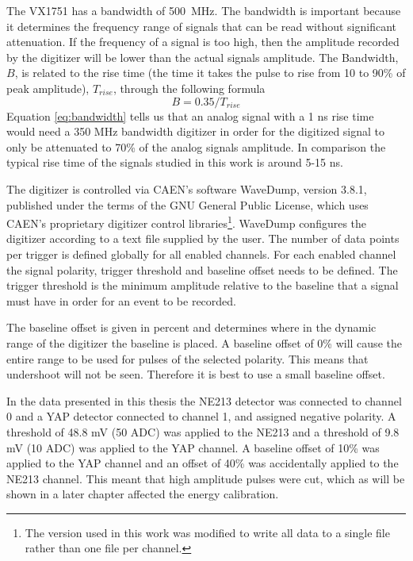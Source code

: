 \documentclass[main.tex]{subfiles}
\begin{document}
The VX1751 has a bandwidth of \si{500 \mega\hertz}. The bandwidth is important because it determines the frequency range of signals that can be read without significant attenuation. If the frequency of a signal is too high, then the amplitude recorded by the digitizer will be lower than the actual signals amplitude. The Bandwidth, $B$, is related to the rise time (the time it takes the pulse to rise from 10 to 90\% of peak amplitude), $T_{rise}$, through the following formula\cite[p.354]{Leo}
\begin{equation}
\label{eq:bandwidth}
B=0.35/T_{rise}
\end{equation}
Equation \ref{eq:bandwidth} tells us that an analog signal with a 1 ns rise time would need a 350 MHz bandwidth digitizer in order for the digitized signal to only be attenuated to 70\% of the analog signals amplitude. In comparison the typical rise time of the signals studied in this work is around 5-15 ns.

The digitizer is controlled via CAEN's software WaveDump, version 3.8.1, published under the terms of the GNU General Public License\cite{WaveDump}, which uses CAEN's proprietary digitizer control libraries\footnote{The version used in this work was modified to write all data to a single file rather than one file per channel.}. WaveDump configures the digitizer according to a text file supplied by the user. The number of data points per trigger is defined globally for all enabled channels. For each enabled channel the signal polarity, trigger threshold and baseline offset needs to be defined. The trigger threshold is the minimum amplitude relative to the baseline that a signal must have in order for an event to be recorded. 

The baseline offset is given in percent and determines where in the dynamic range of the digitizer the baseline is placed. A baseline offset of 0\% will cause the entire range to be used for pulses of the selected polarity. This means that undershoot will not be seen. Therefore it is best to use a small baseline offset.

In the data presented in this thesis the NE213 detector was connected to channel 0 and a YAP detector connected to channel 1, and assigned negative polarity. A threshold of 48.8 mV (50 ADC) was applied to the NE213 and a threshold of 9.8 mV (10 ADC) was applied to the YAP channel. A baseline offset of 10\% was applied to the YAP channel and an offset of 40\% was accidentally applied to the NE213 channel. This meant that high amplitude pulses were cut, which as will be shown in a later chapter affected the energy calibration.
\end{document}
